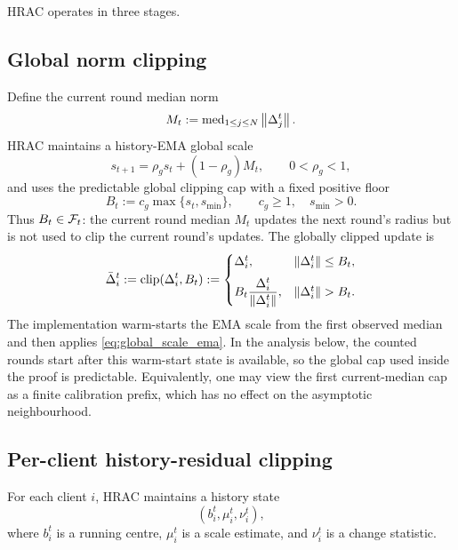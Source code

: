 HRAC operates in three stages.

\subsection{Global norm clipping}

Define the current round median norm
\begin{equation}
    M_t := \operatorname{med}_{1\le j\le N}\left\lVert \Delta_j^t \right\rVert.
    \label{eq:round_median_norm}
\end{equation}
HRAC maintains a history-EMA global scale
\begin{equation}
    s_{t+1}
    =
    \rho_gs_t+(1-\rho_g)M_t,
    \qquad 0<\rho_g<1,
    \label{eq:global_scale_ema}
\end{equation}
and uses the predictable global clipping cap with a fixed positive floor
\begin{equation}
    B_t := c_g\max\{s_t,s_{\min}\},
    \qquad c_g\ge1,\quad s_{\min}>0.
    \label{eq:global_cap}
\end{equation}
Thus \(B_t\in\mathcal{F}_t\): the current round median \(M_t\) updates the next round's
radius but is not used to clip the current round's updates. The globally
clipped update is
\begin{equation}
    \bar{\Delta}_i^t
    :=
    \operatorname{clip}(\Delta_i^t, B_t)
    :=
    \begin{cases}
        \Delta_i^t, & \left\lVert \Delta_i^t \right\rVert \le B_t,\\[2mm]
        B_t \dfrac{\Delta_i^t}{\left\lVert \Delta_i^t \right\rVert}, & \left\lVert \Delta_i^t \right\rVert > B_t.
    \end{cases}
    \label{eq:global_clip}
\end{equation}
The implementation warm-starts the EMA scale from the first observed median and
then applies \eqref{eq:global_scale_ema}. In the analysis below, the counted
rounds start after this warm-start state is available, so the global cap used
inside the proof is predictable. Equivalently, one may view the first
current-median cap as a finite calibration prefix, which has no effect on the
asymptotic neighbourhood.

\subsection{Per-client history-residual clipping}

For each client \(i\), HRAC maintains a history state
\[
    (b_i^t,\mu_i^t,\nu_i^t),
\]
where \(b_i^t\) is a running centre, \(\mu_i^t\) is a scale estimate, and
\(\nu_i^t\) is a change statistic.

